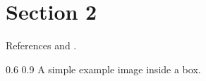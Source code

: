 
\section{Section 2}
References \parencite{Ref01}  and \parencite{Ref02}.

\begin{centerBoxImageStyle}
    {}     
    {0.6\linewidth}                         
    {0.9\linewidth}                         
    {A simple example image inside a box.}  
    {}               
\end{centerBoxImageStyle}

